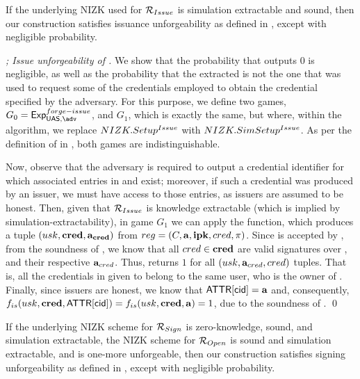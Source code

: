 \begin{theorem}
  \label{thm:issue-forge-uas}
  If the underlying NIZK used for $\mathcal{R}_{Issue}$ is simulation extractable
  and sound, then our \CUASGen construction satisfies issuance unforgeability as
  defined in , except with negligible probability.
\end{theorem}

\begin{proof}[; Issue unforgeability of \CUASGen]
  We show that the probability that \fissue outputs $0$ is negligible, as well
  as the probability that the extracted \usk is not the one that was used to
  request some of the credentials employed to obtain the credential specified by
  the adversary.
  For this purpose, we define two games, $G_0=\ExpForgeIssue$, and $G_1$, which
  is exactly the same, but where, within the \Setup algorithm, we replace
  $NIZK.Setup^{Issue}$ with $NIZK.SimSetup^{Issue}$. As per the definition of
  \NIZK in , both games are indistinguishable.

  Now, observe that the adversary is required to output a credential
  identifier for which associated entries in \trans and \CRED exist; moreover,
  if such a credential was produced by an issuer, we must have access to those
  entries, as issuers are assumed to be honest.
  Then, given that $\mathcal{R}_{Issue}$ is knowledge extractable (which is implied
  by simulation-extractability), in game $G_1$
  we can apply the \NIZKExtract function, which produces a tuple $(usk,\mathbf{cred},
  \mathbf{a}_{\mathbf{cred}})$ from $reg = (C,\mathbf{a},\mathbf{ipk},cred,\pi)$.
  Since \NIZKproof is accepted by \ExtractIssue, from the soundness of \NIZK, we
  know that all $cred \in \mathbf{cred}$ are valid signatures over \usk, and their
  respective $\mathbf{a}_{cred}$. Thus, \IdentifyCred returns $1$ for all $(usk,
  \mathbf{a}_{cred},cred)$ tuples. That is, all the credentials in \scred given
  to \fissue belong to the same user, who is the owner of \usk.
  Finally, since issuers are honest, we know that $\mathsf{ATTR}[\mathsf{cid}] = \mathbf{a}$ and,
  consequently, $f_{is}(usk,\mathbf{cred},\mathsf{ATTR}[\mathsf{cid}]) = f_{is}(usk,\mathbf{cred},\mathbf{a})
  = 1$, due to the soundness of \NIZK.
  \qed
\end{proof}

\begin{theorem}
  \label{thm:sign-forge-uas}
  If the underlying NIZK scheme for $\mathcal{R}_{Sign}$ is zero-knowledge, sound,
  and simulation extractable, the NIZK scheme for $\mathcal{R}_{Open}$ is sound
  and simulation extractable, and \SBCM is one-more unforgeable, then our
  \CUASGen construction satisfies signing unforgeability as defined in
  , except with negligible probability.
\end{theorem}


